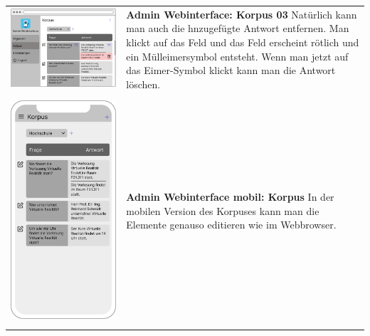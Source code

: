 \begin{tabular}{C{6cm}  L{7cm}}
    \includegraphics[width=\linewidth]{bilder/new vers. UI Design/Korpus/Admin Interface 03.png} & \textbf{Admin Webinterface: Korpus 03} \newline 
    Natürlich kann man auch die hnzugefügte Antwort entfernen. Man klickt auf das Feld und das Feld erscheint rötlich und ein
    Mülleimersymbol entsteht. Wenn man jetzt auf das Eimer-Symbol klickt kann man die
    Antwort löschen. \\
    \includegraphics[width=5cm,height=8.5cm]{bilder/new vers. UI Design/Korpus/iPhone X Korpus I.png} & \textbf{Admin Webinterface mobil: Korpus} \newline 
    In der mobilen Version des Korpuses kann man die Elemente genauso editieren wie im Webbrowser.  \\

\end{tabular}
